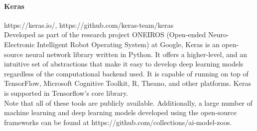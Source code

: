 \paragraph{Keras} https://keras.io/, https://github.com/keras-team/keras \\Developed as part of the research project ONEIROS (Open-ended Neuro-Electronic Intelligent Robot Operating System) at Google, Keras is an open-source neural network library written in Python. It offers a higher-level, and an intuitive set of abstractions that make it easy to develop deep learning models regardless of the computational backend used. It is capable of running on top of TensorFlow, Microsoft Cognitive Toolkit, R, Theano, and other platforms. Keras is supported in Tensorflow's core library. 
\\
Note that all of these tools are publicly available. Additionally, a large number of machine learning and deep learning models developed using the open-source frameworks can be found at https://github.com/collections/ai-model-zoos.

